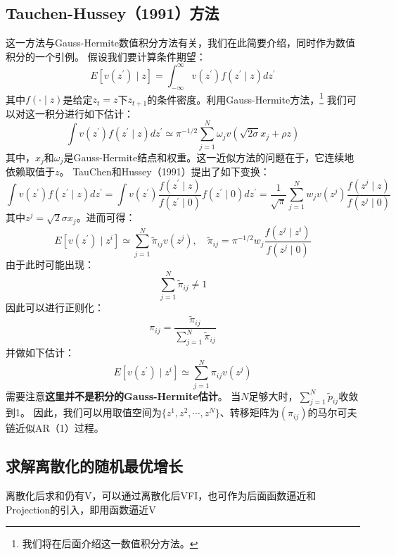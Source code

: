 \subsection{Tauchen-Hussey（1991）方法}

这一方法与Gauss-Hermite数值积分方法有关，我们在此简要介绍，同时作为数值积分的一个引例。
假设我们要计算条件期望：
\begin{equation*}
    E\left[v\left(z^{\prime}\right) \mid z\right] = 
        \int_{-\infty}^{\infty} v\left(z^{\prime}\right) f\left(z^{\prime} \mid z\right) d z^{\prime}
\end{equation*}
其中$f(\cdot\mid z)$是给定$z_t=z$下$z_{t+1}$的条件密度。利用Gauss-Hermite方法，\footnote{我们将在后面介绍这一数值积分方法。}
我们可以对这一积分进行如下估计：
\begin{equation*}
    \int v\left(z^{\prime}\right) f\left(z^{\prime} \mid z\right) dz^{\prime} \simeq 
        \pi^{-1 / 2} \sum_{j=1}^N \omega_j v\left(\sqrt{2 \sigma} x_j+\rho z\right)
\end{equation*}
其中，$x_j$和$\omega_j$是Gauss-Hermite结点和权重。这一近似方法的问题在于，它连续地依赖取值于$z$。
TauChen和Hussey（1991）提出了如下变换：
\begin{equation*}
    \int v\left(z^{\prime}\right) f\left(z^{\prime} \mid z\right) d z^{\prime} = 
        \int v\left(z^{\prime}\right)\frac{f\left(z^{\prime} \mid z\right)}{f\left(z^{\prime} \mid 0\right)} 
            f\left(z^{\prime} \mid 0\right) d z^{\prime} =
        \frac{1}{\sqrt{\pi}} \sum_{j=1}^N w_j v\left(z^j\right)
            \frac{f\left(z^j \mid z\right)}{f\left(z^j \mid 0\right)}
\end{equation*}
其中$z^j=\sqrt{2}\sigma x_j$。进而可得：
\begin{equation*}
    E\left[v\left(z^{\prime}\right) \mid z^i\right] \simeq \sum_{j=1}^N \tilde{\pi}_{i j} v\left(z^j\right), \quad
        \tilde{\pi}_{i j}=\pi^{-1 / 2} w_j \frac{f\left(z^j \mid z^i\right)}{f\left(z^j \mid 0\right)}
\end{equation*}
由于此时可能出现：
\begin{equation*}
    \sum_{j=1}^N \tilde{\pi}_{i j} \neq 1
\end{equation*}
因此可以进行正则化：
\begin{equation*}
    \pi_{i j} = \frac{\tilde{\pi}_{i j}}{\sum_{j=1}^N \tilde{\pi}_{i j}}
\end{equation*}
并做如下估计：
\begin{equation*}
    E\left[v\left(z^{\prime}\right) \mid z^i\right] \simeq \sum_{j=1}^N \pi_{i j} v\left(z^j\right)
\end{equation*}
需要注意\textbf{这里并不是积分的Gauss-Hermite估计}。
当$N$足够大时，$\sum_{j=1}^{N}\tilde{p}_{ij}$收敛到1。
因此，我们可以用取值空间为$\{z^1,z^2,\cdots,z^N\}$、转移矩阵为$(\pi_{ij})$的马尔可夫链近似AR（1）过程。


\subsection{求解离散化的随机最优增长}




离散化后求和仍有V，可以通过离散化后VFI，也可作为后面函数逼近和Projection的引入，即用函数逼近V
